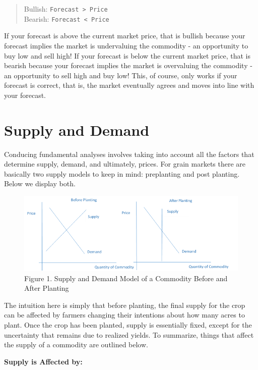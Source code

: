 \documentclass[]{book}
\theoremstyle{definition}
\theoremstyle{definition}
\theoremstyle{remark}
\begin{document}
\begin{quote}
Bullish: \texttt{Forecast\ \textgreater{}\ Price}\\
Bearish: \texttt{Forecast\ \textless{}\ Price}
\end{quote}

If your forecast is above the current market price, that is bullish
because your forecast implies the market is undervaluing the commodity -
an opportunity to buy low and sell high! If your forecast is below the
current market price, that is bearish because your forecast implies the
market is overvaluing the commodity - an opportunity to sell high and
buy low! This, of course, only works if your forecast is correct, that
is, the market eventually agrees and moves into line with your forecast.

\section{Supply and Demand}\label{supply-and-demand}

Conducing fundamental analyses involves taking into account all the
factors that determine supply, demand, and ultimately, prices. For grain
markets there are basically two supply models to keep in mind:
preplanting and post planting. Below we display both.

\begin{figure}[htbp]
\centering
\includegraphics{images/Ch3.1.png}
\caption{Figure 1. Supply and Demand Model of a Commodity Before and
After Planting}
\end{figure}

The intuition here is simply that before planting, the final supply for
the crop can be affected by farmers changing their intentions about how
many acres to plant. Once the crop has been planted, supply is
essentially fixed, except for the uncertainty that remains due to
realized yields. To summarize, things that affect the supply of a
commodity are outlined below.

\textbf{Supply is Affected by:}
\end{document}
